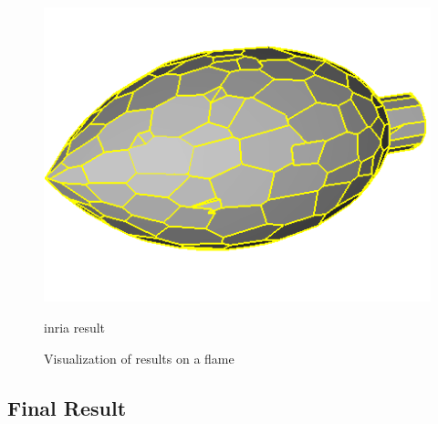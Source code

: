\documentclass{article}
\begin{document}
\begin{figure}[H]
\begin{minipage}[t]{0.27\textwidth}
        \includegraphics[width=\textwidth]{../../images/screen_kinetic/flame_inria.png}
        \caption*{inria result}
      \end{minipage}
      \caption{Visualization of results on a flame}
\end{figure}

\subsection{Final Result}
\end{document}
